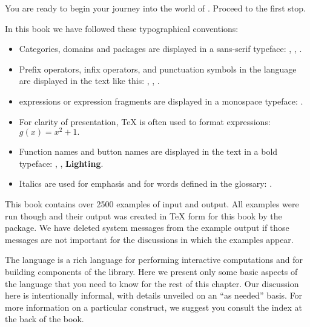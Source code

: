 You are ready to begin your journey into the world of \Language{}.
Proceed to the first stop.


In this book we have followed these typographical conventions:
\begin{itemize}
%
\item Categories, domains and packages are displayed in
a sans-serif typeface:
, , .
%
\item Prefix operators, infix operators, and punctuation symbols in the \Language{}
language are displayed in the text like this:
\spadop{+}, \spadSyntax{$}, \spadSyntax{+->}.
%
\item \Language{} expressions or expression fragments are displayed in
a mon\-o\-space typeface:
.
%
\item For clarity of presentation, \TeX{} is often
used to format expressions: $g(x)=x^2+1.$
%
\item Function names and \HyperName{} button names
are displayed in the text in
a bold typeface:
, ,  {\bf Lighting}.
%
\item Italics are used for emphasis and for words defined in the
glossary: .
\end{itemize}

This book contains over 2500 examples of \Language{} input and output.
All examples were run though \Language{} and their output was
created in \TeX{} form for this book by the \Language{}
 package.
We have deleted system messages from the example output if those
messages are not important for the discussions in which the examples
appear.

%

The \Language{} language is a rich language for performing
interactive computations and for building components of the
\Language{} library.
Here we present only some basic aspects of the language that you
need to know for the rest of this chapter.
Our discussion here is intentionally informal, with details
unveiled on an ``as needed'' basis.
For more information on a particular construct, we suggest you
consult the index at the back of the book.

